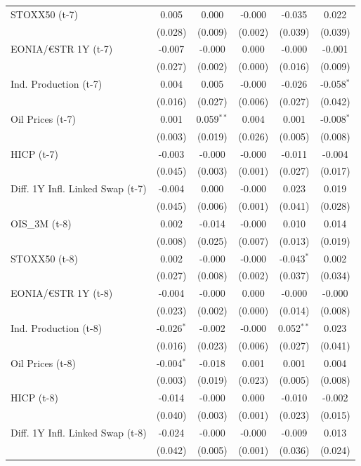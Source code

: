 \begin{longtable}[t]{lccccc}
STOXX50 (t-7) & 0.005 & 0.000 & -0.000 & -0.035 & 0.022\\
 & (0.028) & (0.009) & (0.002) & (0.039) & (0.039)\\
EONIA/€STR 1Y (t-7) & -0.007 & -0.000 & 0.000 & -0.000 & -0.001\\
 & (0.027) & (0.002) & (0.000) & (0.016) & (0.009)\\
Ind. Production (t-7) & 0.004 & 0.005 & -0.000 & -0.026 & -0.058$^{*}$\\
 & (0.016) & (0.027) & (0.006) & (0.027) & (0.042)\\
Oil Prices (t-7) & 0.001 & 0.059$^{**}$ & 0.004 & 0.001 & -0.008$^{*}$\\
 & (0.003) & (0.019) & (0.026) & (0.005) & (0.008)\\
HICP (t-7) & -0.003 & -0.000 & -0.000 & -0.011 & -0.004\\
 & (0.045) & (0.003) & (0.001) & (0.027) & (0.017)\\
Diff. 1Y Infl. Linked Swap (t-7) & -0.004 & 0.000 & -0.000 & 0.023 & 0.019\\
 & (0.045) & (0.006) & (0.001) & (0.041) & (0.028)\\
OIS\_3M (t-8) & 0.002 & -0.014 & -0.000 & 0.010 & 0.014\\
 & (0.008) & (0.025) & (0.007) & (0.013) & (0.019)\\
STOXX50 (t-8) & 0.002 & -0.000 & -0.000 & -0.043$^{*}$ & 0.002\\
 & (0.027) & (0.008) & (0.002) & (0.037) & (0.034)\\
EONIA/€STR 1Y (t-8) & -0.004 & -0.000 & 0.000 & -0.000 & -0.000\\
 & (0.023) & (0.002) & (0.000) & (0.014) & (0.008)\\
Ind. Production (t-8) & -0.026$^{*}$ & -0.002 & -0.000 & 0.052$^{**}$ & 0.023\\
 & (0.016) & (0.023) & (0.006) & (0.027) & (0.041)\\
Oil Prices (t-8) & -0.004$^{*}$ & -0.018 & 0.001 & 0.001 & 0.004\\
 & (0.003) & (0.019) & (0.023) & (0.005) & (0.008)\\
HICP (t-8) & -0.014 & -0.000 & 0.000 & -0.010 & -0.002\\
 & (0.040) & (0.003) & (0.001) & (0.023) & (0.015)\\
Diff. 1Y Infl. Linked Swap (t-8) & -0.024 & -0.000 & -0.000 & -0.009 & 0.013\\
 & (0.042) & (0.005) & (0.001) & (0.036) & (0.024)\\

\end{longtable}
